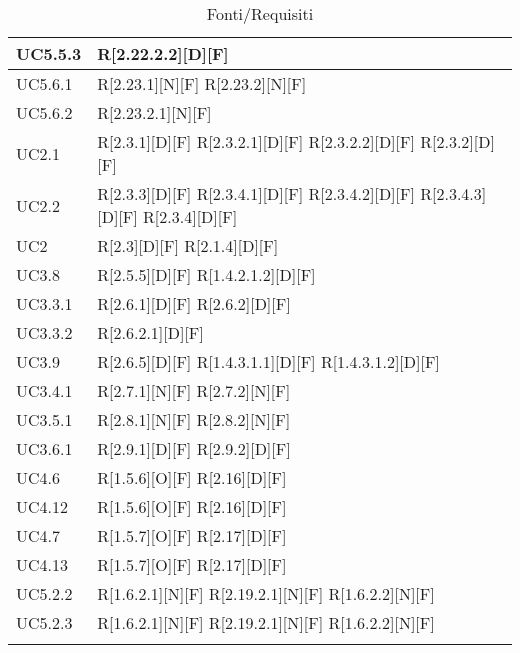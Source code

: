 \begin{longtable}{X | X}
\hline
UC5.5.3 & R[2.22.2.2][D][F]  \\
\hline
UC5.6.1 & R[2.23.1][N][F] \newline
R[2.23.2][N][F]  \\
\hline
UC5.6.2 & R[2.23.2.1][N][F]  \\
\hline
UC2.1 & R[2.3.1][D][F] \newline
R[2.3.2.1][D][F] \newline
R[2.3.2.2][D][F] \newline
R[2.3.2][D][F]  \\
\hline
UC2.2 & R[2.3.3][D][F] \newline
R[2.3.4.1][D][F] \newline
R[2.3.4.2][D][F] \newline
R[2.3.4.3][D][F] \newline
R[2.3.4][D][F]  \\
\hline
UC2 & R[2.3][D][F] \newline
R[2.1.4][D][F]  \\
\hline
UC3.8 & R[2.5.5][D][F] \newline
R[1.4.2.1.2][D][F]  \\
\hline
UC3.3.1 & R[2.6.1][D][F] \newline
R[2.6.2][D][F]  \\
\hline
UC3.3.2 & R[2.6.2.1][D][F]  \\
\hline
UC3.9 & R[2.6.5][D][F] \newline
R[1.4.3.1.1][D][F] \newline
R[1.4.3.1.2][D][F]  \\
\hline
UC3.4.1 & R[2.7.1][N][F] \newline
R[2.7.2][N][F]  \\
\hline
UC3.5.1 & R[2.8.1][N][F] \newline
R[2.8.2][N][F]  \\
\hline
UC3.6.1 & R[2.9.1][D][F] \newline
R[2.9.2][D][F]  \\
\hline
UC4.6 & R[1.5.6][O][F] \newline
R[2.16][D][F]  \\
\hline
UC4.12 & R[1.5.6][O][F] \newline
R[2.16][D][F]  \\
\hline
UC4.7 & R[1.5.7][O][F] \newline
R[2.17][D][F]  \\
\hline
UC4.13 & R[1.5.7][O][F] \newline
R[2.17][D][F]  \\
\hline
UC5.2.2 & R[1.6.2.1][N][F] \newline
R[2.19.2.1][N][F] \newline
R[1.6.2.2][N][F]  \\
\hline
UC5.2.3 & R[1.6.2.1][N][F] \newline
R[2.19.2.1][N][F] \newline
R[1.6.2.2][N][F]  \\
\hline
\bottomrule
\caption{Fonti/Requisiti}
\end{longtable}   